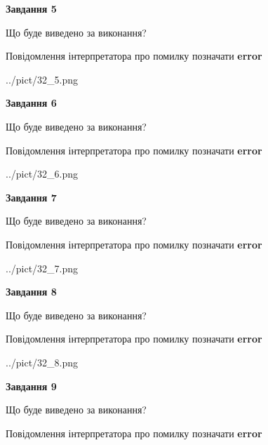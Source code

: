 \documentclass[11pt, ukrainian]{article}
\begin{document}
{\begin {large}
{\begin {center}\textbf{Завдання 5}\end {center}}\par
Що буде виведено за виконання? \par
Повідомлення інтерпретатора про помилку позначати \textbf{error}

\begin{center}
	{../pict/32_5.png}
\end{center}
\newpage

{\begin {center}\textbf{Завдання 6}\end {center}}\par
Що буде виведено за виконання? \par
Повідомлення інтерпретатора про помилку позначати \textbf{error}

\begin{center}
	{../pict/32_6.png}
\end{center}
\newpage

{\begin {center}\textbf{Завдання 7}\end {center}}\par
Що буде виведено за виконання? \par
Повідомлення інтерпретатора про помилку позначати \textbf{error}

\begin{center}
	{../pict/32_7.png}
\end{center}
\newpage

{\begin {center}\textbf{Завдання 8}\end {center}}\par
Що буде виведено за виконання? \par
Повідомлення інтерпретатора про помилку позначати \textbf{error}

\begin{center}
	{../pict/32_8.png}
\end{center}
\newpage

{\begin {center}\textbf{Завдання 9}\end {center}}\par
Що буде виведено за виконання? \par
Повідомлення інтерпретатора про помилку позначати \textbf{error}


\end{large}}
\end{document}
